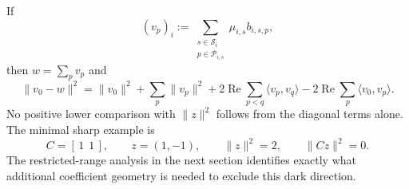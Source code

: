 If
\begin{equation}
 (v_p)_i
 :=\sum_{\substack{s\in\mathcal S_i\\p\in\mathcal P_{i,s}}}
   \mu_{i,s}b_{i,s,p},
 \label{eq:tpc58-individual-high-vectors}
\end{equation}
then \(w=\sum_pv_p\) and
\begin{equation}
 \boxed{
 \|v_0-w\|^2
 =\|v_0\|^2+\sum_p\|v_p\|^2
  +2\operatorname{Re}\sum_{p<q}\langle v_p,v_q\rangle
  -2\operatorname{Re}\sum_p\langle v_0,v_p\rangle.}
 \label{eq:tpc58-affine-signed-expansion}
\end{equation}
No positive lower comparison with \(\|z\|^2\) follows from the diagonal
terms alone.  The minimal sharp example is
\begin{equation}
 C=[\,1\ \ 1\,],
 \qquad z=(1,-1),
 \qquad \|z\|^2=2,
 \qquad \|Cz\|^2=0.
 \label{eq:tpc58-sharp-native-cancellation}
\end{equation}
The restricted-range analysis in the next section identifies exactly what
additional coefficient geometry is needed to exclude this dark direction.
